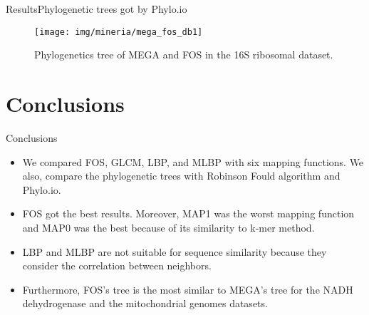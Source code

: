 \documentclass[10pt]{beamer}
\newcommand{\1}{
	\setbeamertemplate{background}{
		\texttt{[image: img/1\_dna]}
		\tikz[overlay] \fill[fill opacity=0.75,fill=white] (0,0) rectangle (-\paperwidth,\paperheight);
	}
}
\begin{document}
\begin{frame}{Results}{Phylogenetic trees got by Phylo.io}
	\begin{figure}[hbt!]
		\centering
		
			\texttt{[image: img/mineria/mega\_fos\_db1]}

		
		\caption{Phylogenetics tree of MEGA and FOS in the 16S ribosomal dataset.}
		\label{img:mouse}
	\end{figure}
\end{frame}

\section{Conclusions}
\begin{frame}{Conclusions}{}
	\begin{itemize}
		\item We compared FOS, GLCM, LBP, and MLBP with six mapping functions. We also, compare the phylogenetic trees with Robinson Fould algorithm and Phylo.io. \pause
		\item FOS got the best results. Moreover, MAP1 was the worst mapping function and MAP0 was the best because of its similarity to k-mer method. \pause
		\item LBP and MLBP are not suitable for sequence similarity because they consider the correlation between neighbors. \pause
		\item Furthermore, FOS's tree is the most similar to MEGA's tree for the NADH dehydrogenase and the mitochondrial genomes datasets.
	\end{itemize}
\end{frame}
\end{document}

